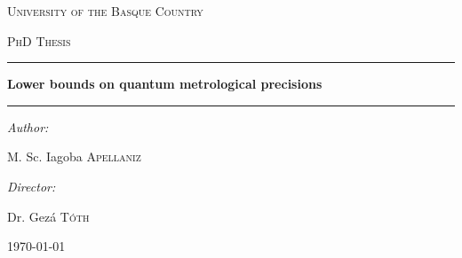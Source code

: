 

\begin{center}

\vspace*{20pt}
\textsc{\LARGE University of the Basque Country}

\vspace{20pt}
\textsc{\Large PhD Thesis}

\vspace{50pt} 
\hrule 

\vspace{16pt}
{ \huge \bfseries Lower bounds on quantum metrological precisions}
\vspace{16pt}

\hrule
\vspace{40pt}

\begin{minipage}{0.4\textwidth}
\begin{flushleft} \large
\emph{Author:}


M. Sc. Iagoba \textsc{Apellaniz}
\end{flushleft}
\end{minipage}
\begin{minipage}{0.4\textwidth}
\begin{flushright} \large
\emph{Director:}

Dr. Gez\'a \textsc{T\'oth} %
\end{flushright}
\end{minipage}

\vfill

{\large \today}

\end{center}

\cleardoublepage